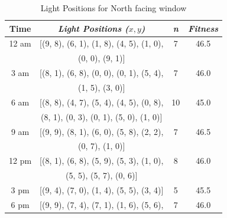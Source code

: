\documentclass[conference]{IEEEtran}
\begin{document}
\begin{table}[htbp]
    \caption{Light Positions for North facing window}
    \begin{center}
        \begin{tabular}{|c|c|c|c|}
            \hline
            \textbf{Time} & \textbf{\textit{Light Positions ($x, y$)}}               & \textbf{\textit{n}} & \textbf{\textit{Fitness}} \\
            \hline
            12 am         & [(9, 8), (6, 1), (1, 8), (4, 5), (1, 0),                 & 7                   & 46.5                      \\
                          & (0, 0), (9, 1)]                                          &                     &                           \\
            \hline
            3 am          & [(8, 1), (6, 8), (0, 0), (0, 1), (5, 4),                 & 7                   & 46.0                      \\
                          & (1, 5), (3, 0)]                                          &                     &                           \\
            \hline
            6 am          & [(8, 8), (4, 7), (5, 4), (4, 5), (0, 8),                 & 10                  & 45.0                      \\
                          & (8, 1), (0, 3), (0, 1), (5, 0), (1, 0)]                  &                     &                           \\
            \hline
            9 am          & [(9, 9), (8, 1), (6, 0), (5, 8), (2, 2),                 & 7                   & 46.5                      \\
                          & (0, 7), (1, 0)]                                          &                     &                           \\
            \hline
            12 pm         & [(8, 1), (6, 8), (5, 9), (5, 3), (1, 0),                 & 8                   & 46.0                      \\
                          & (5, 5), (5, 7), (0, 6)]                                  &                     &                           \\
            \hline
            3 pm          & [(9, 4), (7, 0), (1, 4), (5, 5), (3, 4)]                 & 5                   & 45.5                      \\
            \hline
            6 pm          & [(9, 9), (7, 4), (7, 1), (1, 6), (5, 6),                 & 7                   & 46.0                      \\

\end{tabular}
\end{center}
\end{table}
\end{document}
